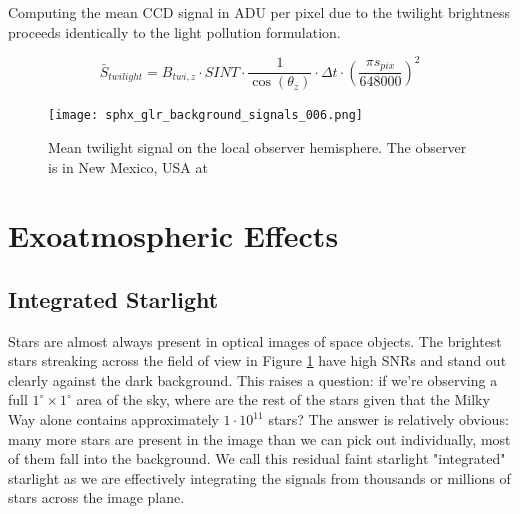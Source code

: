 Computing the mean CCD signal in ADU per pixel due to the twilight brightness proceeds identically to the light pollution formulation. 

\begin{equation} \label{eq:twilight_adu}
  \bar{S}_{twilight} = B_{twi,z} \cdot SINT \cdot \frac{1}{\cos(\theta_z)} \cdot \Delta t \cdot \left( \frac{\pi s_{pix}}{648000} \right)^2
\end{equation}

\begin{figure}[ht]
  \centering
  \texttt{[image: sphx\_glr\_background\_signals\_006.png]}
  \caption{Mean twilight signal on the local observer hemisphere. The observer is in New Mexico, USA at
  \pogslla}
  \label{fig:pollution_hemi}
\end{figure}

\section{Exoatmospheric Effects}

\subsection{Integrated Starlight}

Stars are almost always present in optical images of space objects. The brightest stars streaking across the field of view in Figure \ref{fig:pollution_hemi} have high SNRs and stand out clearly against the dark background. This raises a question: if we're observing a full $1^\circ \times 1^\circ$ area of the sky, where are the rest of the stars given that the Milky Way alone contains approximately $1\cdot10^{11}$ stars? The answer is relatively obvious: many more stars are present in the image than we can pick out individually, most of them fall into the background. We call this residual faint starlight "integrated" starlight as we are effectively integrating the signals from thousands or millions of stars across the image plane. 

